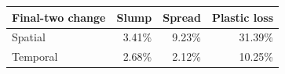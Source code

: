 \begin{tabular}{lrrr}
\toprule
Final-two change & Slump & Spread & Plastic loss \\
\midrule
Spatial & 3.41\% & 9.23\% & 31.39\% \\
Temporal & 2.68\% & 2.12\% & 10.25\% \\
\bottomrule
\end{tabular}
